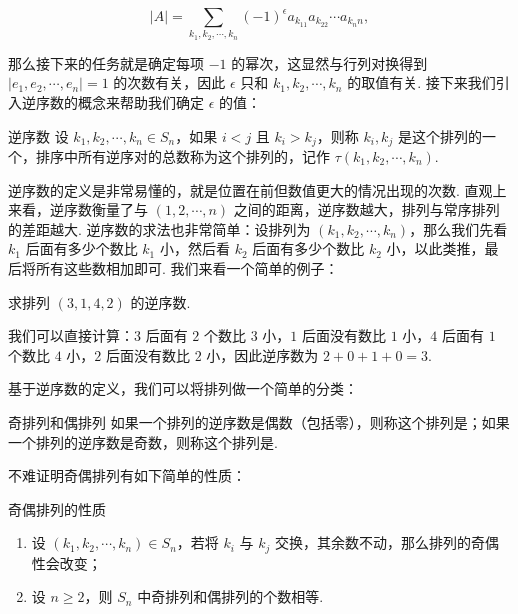 \[|A| = \sum\limits_{k_1,k_2,\cdots,k_n} (-1)^\epsilon a_{k_11}a_{k_22}\cdots a_{k_nn},\]

那么接下来的任务就是确定每项 $-1$ 的幂次，这显然与行列对换得到 $|e_1,e_2,\cdots,e_n| = 1$ 的次数有关，因此 $\epsilon$ 只和 $k_1,k_2,\cdots,k_n$ 的取值有关. 接下来我们引入逆序数的概念来帮助我们确定 $\epsilon$ 的值：

\begin{definition}{逆序数}{}
    设 $k_1,k_2,\cdots,k_n \in S_n$，如果 $i < j$ 且 $k_i > k_j$，则称 $k_i,k_j$ 是这个排列的一个，排序中所有逆序对的总数称为这个排列的，记作 $\tau(k_1,k_2,\cdots,k_n)$.
\end{definition}

逆序数的定义是非常易懂的，就是位置在前但数值更大的情况出现的次数. 直观上来看，逆序数衡量了与 $(1,2,\cdots,n)$ 之间的距离，逆序数越大，排列与常序排列的差距越大. 逆序数的求法也非常简单：设排列为 $(k_1,k_2,\cdots,k_n)$，那么我们先看 $k_1$ 后面有多少个数比 $k_1$ 小，然后看 $k_2$ 后面有多少个数比 $k_2$ 小，以此类推，最后将所有这些数相加即可. 我们来看一个简单的例子：

\begin{example}{}{}
    求排列 $(3,1,4,2)$ 的逆序数.
\end{example}

\begin{solution}
    我们可以直接计算：$3$ 后面有 $2$ 个数比 $3$ 小，$1$ 后面没有数比 $1$ 小，$4$ 后面有 $1$ 个数比 $4$ 小，$2$ 后面没有数比 $2$ 小，因此逆序数为 $2+0+1+0=3$.
\end{solution}

基于逆序数的定义，我们可以将排列做一个简单的分类：

\begin{definition}{奇排列和偶排列}{}
    如果一个排列的逆序数是偶数（包括零），则称这个排列是；如果一个排列的逆序数是奇数，则称这个排列是.
\end{definition}

不难证明奇偶排列有如下简单的性质：
\begin{example}{奇偶排列的性质}{}
    \begin{enumerate}
        \item 设 $(k_1,k_2,\cdots,k_n) \in S_n$，若将 $k_i$ 与 $k_j$ 交换，其余数不动，那么排列的奇偶性会改变；
        \item 设 $n \geqslant 2$，则 $S_n$ 中奇排列和偶排列的个数相等.
    \end{enumerate}
\end{example}

